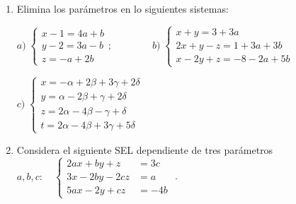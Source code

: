 \begin{enumerate}






\item Elimina los parámetros en lo siguientes sistemas:

 $a)\; \begin{cases} x-1=4a+b\\y-2=3a-b\\z=-a+2b   \end{cases}; \qquad \qquad b)\; \begin{cases} x+y=3+3a\\2x+y-z=1+3a+3b\\x-2y+z=-8-2a+5b   \end{cases}$

$ c)\; \begin{cases} 
x=-\alpha +2\beta +3\gamma +2\delta \\ y=\alpha -2\beta +\gamma + 2\delta \\ z=2\alpha -4\beta - \gamma + \delta \\ t=2\alpha -4\beta +3\gamma +5 \delta \end{cases} $

\vspace{3mm}

 
\item Considera el siguiente SEL dependiente de tres parámetros $a,b, c:\quad \begin{cases} 2ax+by+z&=3c\\3x-2by-2cz&=a\\5ax-2y+cz&=-4b \end{cases}$ .


\end{enumerate}
